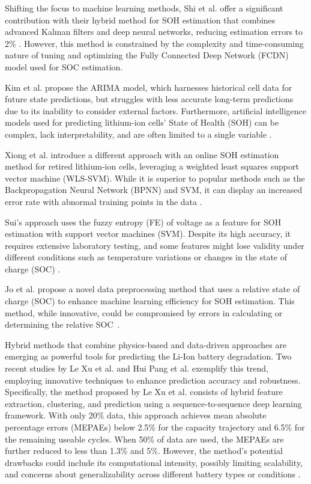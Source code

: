 \documentclass[energies,article,accept,pdftex,moreauthors]{Definitions/mdpi}
\begin{document}
Shifting the focus to machine learning methods, Shi et al. offer a significant contribution with their hybrid method for SOH estimation that combines advanced Kalman filters and deep neural networks, reducing estimation errors to 2\% \cite{Shi.2021}. However, this method is constrained by the complexity and time-consuming nature of tuning and optimizing the Fully Connected Deep Network (FCDN) model used for SOC estimation.

Kim et al. propose the ARIMA model, which harnesses historical cell data for future state predictions, but struggles with less accurate long-term predictions due to its inability to consider external factors. Furthermore, artificial intelligence models used for predicting lithium-ion cells' State of Health (SOH) can be complex, lack interpretability, and are often limited to a single variable \cite{Kim.2022}.

Xiong et al. introduce a different approach with an online SOH estimation method for retired lithium-ion cells, leveraging a weighted least squares support vector machine (WLS-SVM). While it is superior to popular methods such as the Backpropagation Neural Network (BPNN) and SVM, it can display an increased error rate with abnormal training points in the data \cite{Xiong.2021}.

Sui's approach uses the fuzzy entropy (FE) of voltage as a feature for SOH estimation with support vector machines (SVM). Despite its high accuracy, it requires extensive laboratory testing, and some features might lose validity under different conditions such as temperature variations or changes in the state of charge (SOC) \cite{Sui.}.

Jo et al. propose a novel data preprocessing method that uses a relative state of charge (SOC) to enhance machine learning efficiency for SOH estimation. This method, while innovative, could be compromised by errors in calculating or determining the relative SOC~\cite{Jo.2021}.

Hybrid methods that combine physics-based and data-driven approaches are emerging as powerful tools for predicting the Li-Ion battery degradation. Two recent studies by Le Xu et al. \cite{LeXu.2023} and Hui Pang et al. \cite{Pang.2023} exemplify this trend, employing innovative techniques to enhance prediction accuracy and robustness. Specifically, the method proposed by Le Xu et al. consists of hybrid feature extraction, clustering, and prediction using a sequence-to-sequence deep learning framework. With only 20\% data, this approach achieves mean absolute percentage errors (MEPAEs) below 2.5\% for the capacity trajectory and 6.5\% for the remaining useable cycles. When 50\% of data are used, the MEPAEs are further reduced to less than 1.3\% and 5\%. However, the method's potential drawbacks could include its computational intensity, possibly limiting scalability, and concerns about generalizability across different battery types or conditions \cite{LeXu.2023}. %
\end{document}
